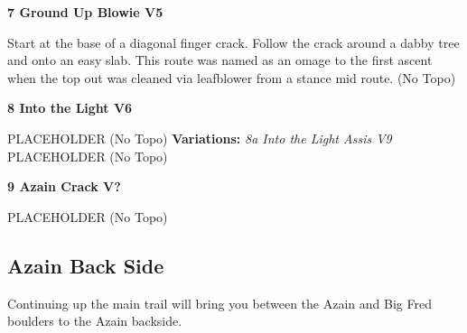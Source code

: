 \begin{multicols}{2}
\label{pt:Ground up Blowie}
					\label{rt:Ground Up Blowie} \colorbox{RoyalBlue!20}{\textbf{7 Ground Up Blowie V5 \ding{72}   }}
					\begin{adjustwidth}{1cm}{}
					Start at the base of a diagonal finger crack. Follow the crack around a dabby tree and onto an easy slab. This route was named as an omage to the first ascent when the top out was cleaned via leafblower from a stance mid route.
						\newline (No Topo) 
					\end{adjustwidth}
					\label{rt:Into the Light} \colorbox{RoyalBlue!20}{\textbf{8 Into the Light V6  }}
					\begin{adjustwidth}{1cm}{}
					PLACEHOLDER
						\newline (No Topo) 
					\newline \textbf{Variations:} \newline
						\label{vr:Into the Light Assis} \colorbox{Goldenrod!50}{\emph{8a Into the Light Assis V9  }}
						PLACEHOLDER
							\newline (No Topo) 
					\end{adjustwidth}
					\label{rt:Azain Crack} \colorbox{black!20}{\textbf{9 Azain Crack V?  }}
					\begin{adjustwidth}{1cm}{}
					PLACEHOLDER
						\newline (No Topo) 
					\end{adjustwidth}
			\subsection*{Azain Back Side}\label{bf:Azain Back Side}
			Continuing up the main trail will bring you between the Azain and Big Fred boulders to the Azain backside.
			


\end{multicols}
